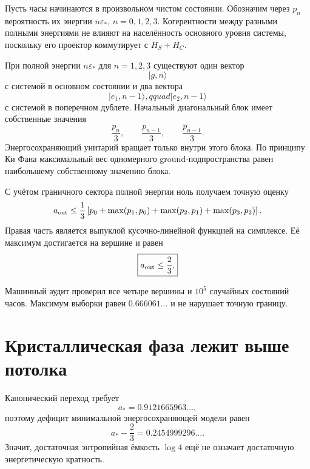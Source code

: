 Пусть часы начинаются в произвольном чистом состоянии. Обозначим через
$p_n$ вероятность их энергии $n\varepsilon_*$, $n=0,1,2,3$. Когерентности
между разными полными энергиями не влияют на населённость основного уровня
системы, поскольку его проектор коммутирует с $H_S+H_C$.

При полной энергии $n\varepsilon_*$ для $n=1,2,3$ существуют один вектор
\begin{equation}
 |g,n\rangle
\end{equation}
с системой в основном состоянии и два вектора
\begin{equation}
 |e_1,n-1\rangle,qquad |e_2,n-1\rangle
\end{equation}
с системой в поперечном дублете. Начальный диагональный блок имеет
собственные значения
\begin{equation}
 \frac{p_n}{3},\qquad\frac{p_{n-1}}{3},\qquad\frac{p_{n-1}}{3}.
\end{equation}
Энергосохраняющий унитарий вращает только внутри этого блока. По принципу
Ки Фана максимальный вес одномерного ground-подпространства равен
наибольшему собственному значению блока.

С учётом граничного сектора полной энергии ноль получаем точную оценку
\begin{equation}
 a_{\rm out}\leq
 \frac13\left[
 p_0+\max(p_1,p_0)+\max(p_2,p_1)+\max(p_3,p_2)
 \right].
 \label{eq:v6-four-clock-ground-bound}
\end{equation}
Правая часть является выпуклой кусочно-линейной функцией на симплексе.
Её максимум достигается на вершине и равен
\begin{equation}
 \boxed{a_{\rm out}\leq\frac23.}
 \label{eq:v6-four-clock-axis-ceiling}
\end{equation}

Машинный аудит проверил все четыре вершины и $10^5$ случайных состояний
часов. Максимум выборки равен $0.666061\ldots$ и не нарушает точную
границу.

\section{Кристаллическая фаза лежит выше потолка}

Канонический переход требует
\begin{equation}
 a_*=0.9121665963\ldots,
\end{equation}
поэтому дефицит минимальной энергосохраняющей модели равен
\begin{equation}
 a_*-\frac23=0.2454999296\ldots.
 \label{eq:v6-four-clock-axis-deficit}
\end{equation}
Значит, достаточная энтропийная ёмкость $\log4$ ещё не означает
достаточную энергетическую кратность.

